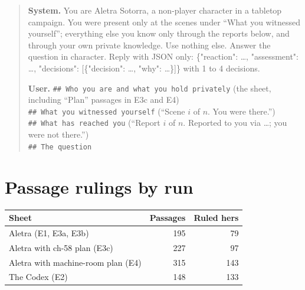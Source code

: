 \documentclass[11pt]{article}
\newcommand{\code}[1]{\texttt{#1}}
\begin{document}
\begin{quote}\small
\textbf{System.} You are Aletra Sotorra, a non-player character in a tabletop campaign. You
were present only at the scenes under ``What you witnessed yourself''; everything else you
know only through the reports below, and through your own private knowledge. Use nothing
else. Answer the question in character. Reply with JSON only: \{"reaction": \ldots,
"assessment": \ldots, "decisions": [\{"decision": \ldots, "why": \ldots\}]\} with 1 to 4
decisions.

\textbf{User.}
\code{\#\# Who you are and what you hold privately} (the sheet, including ``Plan'' passages
in E3c and E4) \\
\code{\#\# What you witnessed yourself} (``Scene $i$ of $n$. You were there.'') \\
\code{\#\# What has reached you} (``Report $i$ of $n$. Reported to you via \ldots; you were not
there.'') \\
\code{\#\# The question}
\end{quote}

\section{Passage rulings by run}

\begin{center}
\small
\begin{tabular}{lrr}
\toprule
Sheet & Passages & Ruled hers \\
\midrule
Aletra (E1, E3a, E3b) & 195 & 79 \\
Aletra with ch-58 plan (E3c) & 227 & 97 \\
Aletra with machine-room plan (E4) & 315 & 143 \\
The Codex (E2) & 148 & 133 \\
\bottomrule
\end{tabular}
\end{center}
\end{document}
